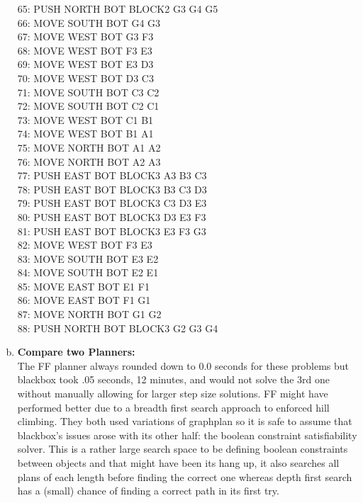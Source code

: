 \documentclass[]{article}
\begin{document}
\begin{enumerate}[(a)]
		          65: PUSH NORTH BOT BLOCK2 G3 G4 G5\\
		          66: MOVE SOUTH BOT G4 G3\\
		          67: MOVE WEST BOT G3 F3\\
		          68: MOVE WEST BOT F3 E3\\
		          69: MOVE WEST BOT E3 D3\\
		          70: MOVE WEST BOT D3 C3\\
		          71: MOVE SOUTH BOT C3 C2\\
		          72: MOVE SOUTH BOT C2 C1\\
		          73: MOVE WEST BOT C1 B1\\
		          74: MOVE WEST BOT B1 A1\\
		          75: MOVE NORTH BOT A1 A2\\
		          76: MOVE NORTH BOT A2 A3\\
		          77: PUSH EAST BOT BLOCK3 A3 B3 C3\\
		          78: PUSH EAST BOT BLOCK3 B3 C3 D3\\
		          79: PUSH EAST BOT BLOCK3 C3 D3 E3\\
		          80: PUSH EAST BOT BLOCK3 D3 E3 F3\\
		          81: PUSH EAST BOT BLOCK3 E3 F3 G3\\
		          82: MOVE WEST BOT F3 E3\\
		          83: MOVE SOUTH BOT E3 E2\\
		          84: MOVE SOUTH BOT E2 E1\\
		          85: MOVE EAST BOT E1 F1\\
		          86: MOVE EAST BOT F1 G1\\
		          87: MOVE NORTH BOT G1 G2\\
		          88: PUSH NORTH BOT BLOCK3 G2 G3 G4\\
		\item \textbf{Compare two Planners:}\\
		The FF planner always rounded down to 0.0 seconds for these problems but blackbox took .05 seconds, 12 minutes, and would not solve the 3rd one without manually allowing for larger step size solutions. FF might have performed better due to a breadth first search approach to enforced hill climbing. They both used variations of graphplan so it is safe to assume that blackbox's issues arose with its other half: the boolean constraint satisfiability solver. This is a rather large search space to be defining boolean constraints between objects and that might have been its hang up, it also searches all plans of each length before finding the correct one whereas depth first search has a (small) chance of finding a correct path in its first try. 

\end{enumerate}
\end{document}
